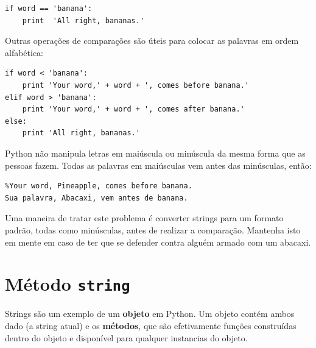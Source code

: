 {\beforeverb
\begin{verbatim}
if word == 'banana':
    print  'All right, bananas.'
\end{verbatim}
\afterverb
%
%
Outras operações de comparações são úteis para colocar as palavras em ordem
alfabética:

\beforeverb
\begin{verbatim}
if word < 'banana':
    print 'Your word,' + word + ', comes before banana.'
elif word > 'banana':
    print 'Your word,' + word + ', comes after banana.'
else:
    print 'All right, bananas.'
\end{verbatim}
\afterverb
%
%
Python não manipula letras em maiúscula ou minúscula da mesma forma que as
pessoas fazem. Todas as palavras em maiúsculas vem antes das minúsculas, então:

\beforeverb
\begin{verbatim}
%Your word, Pineapple, comes before banana.
Sua palavra, Abacaxi, vem antes de banana.
\end{verbatim}
\afterverb
%
%
Uma maneira de tratar este problema é converter strings para um formato
padrão, todas como minúsculas, antes de realizar a comparação. Mantenha isto
em mente em caso de ter que se defender contra alguém armado com um abacaxi.

\section{Método {\tt string}}

Strings são um exemplo de um {\bf objeto} em Python. Um objeto contém ambos
dado (a string atual) e os {\bf métodos}, que são efetivamente funções
construídas dentro do objeto e disponível para qualquer instancias do objeto.

}
